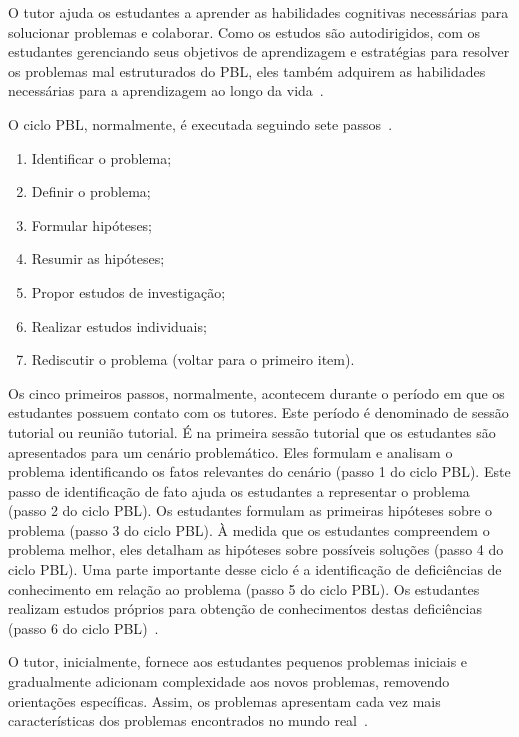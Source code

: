 O tutor ajuda os estudantes a aprender as habilidades cognitivas
necessárias para solucionar problemas e colaborar.
Como os estudos são autodirigidos, com os estudantes gerenciando
seus objetivos de aprendizagem e estratégias
para resolver os problemas mal estruturados do \ac{PBL}, eles
também adquirem as habilidades necessárias para a
aprendizagem ao longo da vida~\cite{hmelo2004problem}.


O ciclo \ac{PBL}, normalmente, é executada seguindo sete
passos~\cite{de2014aprendizado,conrado2014aprendizagem}.

\begin{enumerate}
\item{Identificar o problema;}
\item{Definir o problema;}
\item{Formular hipóteses;}
\item{Resumir as hipóteses;}
\item{Propor estudos de investigação;}
\item{Realizar estudos individuais;}
\item{Rediscutir o problema (voltar para o primeiro item).}
\end{enumerate}

Os cinco primeiros passos, normalmente, acontecem durante o período
em que os estudantes possuem contato com os tutores.
Este período é
denominado de sessão tutorial ou reunião tutorial.
É na primeira sessão tutorial que os estudantes
são apresentados para um cenário problemático.
Eles formulam e analisam o problema identificando os fatos
relevantes do cenário (passo 1 do ciclo \ac{PBL}).
Este passo de identificação de fato ajuda os estudantes
a representar o problema (passo 2 do ciclo \ac{PBL}).
Os estudantes formulam as primeiras hipóteses sobre o
problema (passo 3 do ciclo \ac{PBL}).
À medida que os estudantes compreendem o problema melhor, eles detalham
as hipóteses sobre possíveis soluções (passo 4 do ciclo \ac{PBL}).
Uma parte importante desse ciclo é a identificação de deficiências
de conhecimento em relação ao problema (passo 5 do ciclo \ac{PBL}).
Os estudantes realizam estudos próprios para obtenção de
conhecimentos destas deficiências
(passo 6 do ciclo \ac{PBL})~\cite{hmelo2004problem}.

O tutor, inicialmente, fornece aos estudantes
pequenos problemas iniciais e gradualmente adicionam
complexidade aos novos problemas, removendo orientações
específicas.
Assim, os problemas apresentam cada vez mais
características dos problemas encontrados no mundo
real~\cite{fee2010teaching}.

